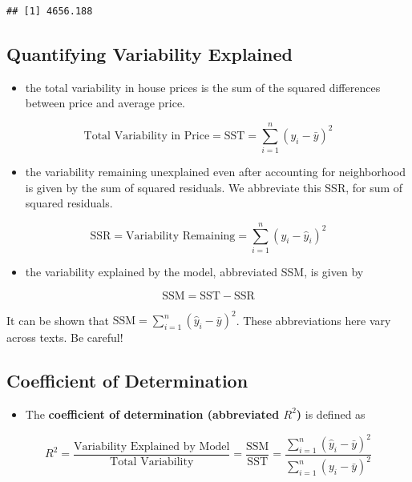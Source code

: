 \documentclass[]{book}
\providecommand{\tightlist}{%
  \setlength{\itemsep}{0pt}\setlength{\parskip}{0pt}}
\begin{document}
\begin{verbatim}
## [1] 4656.188
\end{verbatim}

\subsection{Quantifying Variability
Explained}\label{quantifying-variability-explained}

\begin{itemize}
\tightlist
\item
  the total variability in house prices is the sum of the squared
  differences between price and average price.
\end{itemize}

\[\text{Total Variability in Price}= \text{SST} =\displaystyle\sum_{i=1}^n(y_i-\bar{y})^2\]

\begin{itemize}
\tightlist
\item
  the variability remaining unexplained even after accounting for
  neighborhood is given by the sum of squared residuals. We abbreviate
  this SSR, for sum of squared residuals.
\end{itemize}

\[
\text{SSR} = \text{Variability Remaining}=\displaystyle\sum_{i=1}^n(y_i-\hat{y}_i)^2
\]

\begin{itemize}
\tightlist
\item
  the variability explained by the model, abbreviated SSM, is given by
\end{itemize}

\[ \text{SSM} = \text{SST} - \text{SSR} \]

It can be shown that
\(\text{SSM}=\displaystyle\sum_{i=1}^n(\hat{y}_i-\bar{y})^2\). These
abbreviations here vary across texts. Be careful!

\subsection{Coefficient of
Determination}\label{coefficient-of-determination}

\begin{itemize}
\tightlist
\item
  The \textbf{coefficient of determination (abbreviated \(R^2\))} is
  defined as
\end{itemize}

\[R^2=\frac{\text{Variability Explained by Model}}{\text{Total Variability}}=\frac{\text{SSM}}{\text{SST}} =\frac{\displaystyle\sum_{i=1}^n(\hat{y}_i-\bar{y})^2}{\displaystyle\sum_{i=1}^n(y_i-\bar{y})^2}\]
\end{document}
